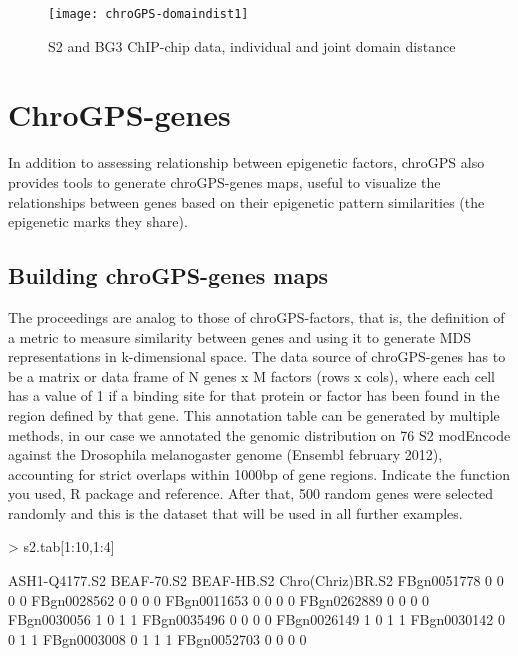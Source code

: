 \documentclass[a4paper,12pt,nogin]{article}
\newcommand{\drcomment}[1]{{\color{red} #1}} %
\begin{document}
\normalsize
 
\begin{figure}
\begin{center}
\texttt{[image: chroGPS-domaindist1]}
\end{center}
\caption{S2 and BG3 ChIP-chip data, individual and joint domain distance}
\label{fig:mds5}
\end{figure}
 
\section{ChroGPS-genes}
\label{ssec:genes}
 
In addition to assessing relationship between epigenetic factors,
chroGPS also provides tools to generate chroGPS-genes maps, useful to
visualize the relationships between genes based on their epigenetic
pattern similarities (the epigenetic marks they share).
 
\subsection{Building chroGPS-genes maps}
\label{ssec:genemaps}
 
The proceedings are analog to those of chroGPS-factors, that is, the
definition of a metric to measure similarity between genes and using
it to generate MDS representations in k-dimensional space. The data
source of chroGPS-genes has to be a matrix or data frame of N genes x
M factors (rows x cols), where each cell has a value of 1 if a binding
site for that protein or factor has been found in the region defined
by that gene. This annotation table can be generated by multiple
methods, in our case we annotated the genomic distribution on 76 S2
modEncode against the Drosophila melanogaster genome (Ensembl february 2012), accounting for
strict overlaps within 1000bp of gene regions. 
\drcomment{Indicate the function you used, R package and reference.}
After that, 500 random
genes were selected randomly and this is the dataset that will be used
in all further examples.
 
\footnotesize
 
\begin{Schunk}
\begin{Sinput}
> s2.tab[1:10,1:4]
\end{Sinput}
\begin{Soutput}
            ASH1-Q4177.S2 BEAF-70.S2 BEAF-HB.S2 Chro(Chriz)BR.S2
FBgn0051778             0          0          0                0
FBgn0028562             0          0          0                0
FBgn0011653             0          0          0                0
FBgn0262889             0          0          0                0
FBgn0030056             1          0          1                1
FBgn0035496             0          0          0                0
FBgn0026149             1          0          1                1
FBgn0030142             0          0          1                1
FBgn0003008             0          1          1                1
FBgn0052703             0          0          0                0
\end{Soutput}
\end{Schunk}
 
\end{document}
